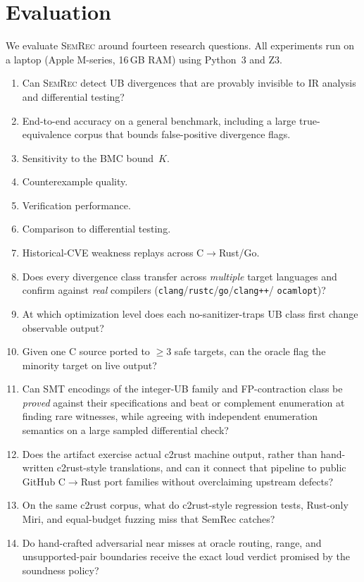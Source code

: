 \documentclass[10pt,a4paper]{article}
\begin{document}
\section{Evaluation}\label{sec:eval}

We evaluate \textsc{SemRec} around fourteen research questions.
All experiments run on a laptop
(Apple M-series, 16\,GB RAM) using Python~3 and Z3.

\begin{enumerate}[nosep]
  \item[\textbf{RQ1}] Can \textsc{SemRec} detect UB divergences that
    are provably invisible to IR analysis and differential testing?
  \item[\textbf{RQ2}] End-to-end accuracy on a general benchmark, including a
    large true-equivalence corpus that bounds false-positive divergence flags.
  \item[\textbf{RQ3}] Sensitivity to the BMC bound~$K$.
  \item[\textbf{RQ4}] Counterexample quality.
  \item[\textbf{RQ5}] Verification performance.
  \item[\textbf{RQ6}] Comparison to differential testing.
  \item[\textbf{RQ7}] Historical-CVE weakness replays across C$\to$Rust/Go.
  \item[\textbf{RQ8}] Does every divergence class transfer across
    \emph{multiple} target languages and confirm against \emph{real}
    compilers (\texttt{clang}/\texttt{rustc}/\texttt{go}/\texttt{clang++}/%
    \texttt{ocamlopt})?
  \item[\textbf{RQ9}] At which optimization level does each
    no-sanitizer-traps UB class first change observable output?
  \item[\textbf{RQ10}] Given one C source ported to $\geq 3$ safe targets, can
    the oracle flag the minority target on live output?
  \item[\textbf{RQ11}] Can SMT encodings of the integer-UB family and
    FP-contraction class be \emph{proved} against their specifications and
    beat or complement enumeration at finding rare witnesses, while agreeing
    with independent enumeration semantics on a large sampled differential
    check?
  \item[\textbf{RQ12}] Does the artifact exercise actual c2rust machine output,
    rather than hand-written c2rust-style translations, and can it connect that
    pipeline to public GitHub C$\to$Rust port families without overclaiming
    upstream defects?
  \item[\textbf{RQ13}] On the same c2rust corpus, what do c2rust-style
    regression tests, Rust-only Miri, and equal-budget fuzzing miss that SemRec
    catches?
  \item[\textbf{RQ14}] Do hand-crafted adversarial near misses at oracle routing,
    range, and unsupported-pair boundaries receive the exact loud verdict
    promised by the soundness policy?
\end{enumerate}
\end{document}
